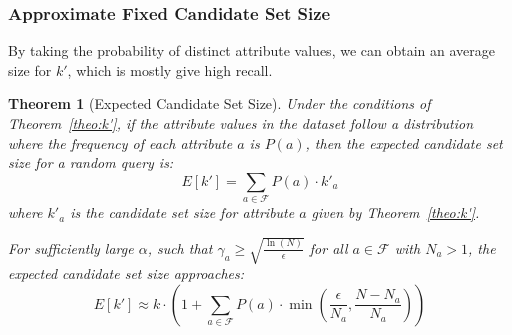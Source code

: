 \documentclass[numbers,sort]{article}
\newtheorem{theorem}{Theorem}
\begin{document}
\subsubsection{Approximate Fixed Candidate Set Size}
By taking the probability of distinct attribute values, we can obtain an average size for $k'$, which is mostly give high recall. 
\begin{theorem}[Expected Candidate Set Size]
\label{theo:expected_set_size}
Under the conditions of Theorem~\ref{theo:k'}, if the attribute values in the dataset follow a distribution where the frequency of each attribute $a$ is $P(a)$, then the expected candidate set size for a random query is:
\begin{equation}
E[k'] = \sum_{a \in \mathcal{F}} P(a) \cdot k'_a
\end{equation}
where $k'_a$ is the candidate set size for attribute $a$ given by Theorem~\ref{theo:k'}.

For sufficiently large $\alpha$, such that $\gamma_a \geq \sqrt{\frac{\ln(N)}{\epsilon}}$ for all $a \in \mathcal{F}$ with $N_a > 1$, the expected candidate set size approaches:
\begin{equation}
E[k'] \approx k \cdot \left(1 + \sum_{a \in \mathcal{F}} P(a) \cdot \min\left(\frac{\epsilon}{N_a}, \frac{N-N_a}{N_a}\right)\right)
\end{equation}
    
\end{theorem}
\end{document}
